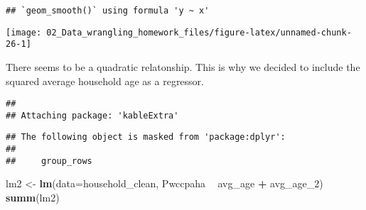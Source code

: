 \documentclass[
]{article}
\newenvironment{Shaded}{\begin{snugshade}}{\end{snugshade}}
\newcommand{\DataTypeTok}[1]{\textcolor[rgb]{0.13,0.29,0.53}{#1}}
\newcommand{\DecValTok}[1]{\textcolor[rgb]{0.00,0.00,0.81}{#1}}
\newcommand{\KeywordTok}[1]{\textcolor[rgb]{0.13,0.29,0.53}{\textbf{#1}}}
\newcommand{\NormalTok}[1]{#1}
\newcommand{\OperatorTok}[1]{\textcolor[rgb]{0.81,0.36,0.00}{\textbf{#1}}}
\newcommand{\StringTok}[1]{\textcolor[rgb]{0.31,0.60,0.02}{#1}}
\begin{document}
\begin{verbatim}
## `geom_smooth()` using formula 'y ~ x'
\end{verbatim}

\begin{center}\texttt{[image: 02\_Data\_wrangling\_homework\_files/figure-latex/unnamed-chunk-26-1]} \end{center}

There seems to be a quadratic relatonship. This is why we decided to
include the squared average household age as a regressor.

\begin{Shaded}
\end{Shaded}

\begin{verbatim}
## 
## Attaching package: 'kableExtra'
\end{verbatim}

\begin{verbatim}
## The following object is masked from 'package:dplyr':
## 
##     group_rows
\end{verbatim}

\begin{Shaded}
\begin{Highlighting}[]
\NormalTok{lm2 <-}\StringTok{ }\KeywordTok{lm}\NormalTok{(}\DataTypeTok{data=}\NormalTok{household_clean, Pwccpaha }\OperatorTok{~}\StringTok{ }\NormalTok{avg_age }\OperatorTok{+}\StringTok{ }\NormalTok{avg_age_}\DecValTok{2}\NormalTok{)}
\KeywordTok{summ}\NormalTok{(lm2)}
\end{Highlighting}
\end{Shaded}
\end{document}
